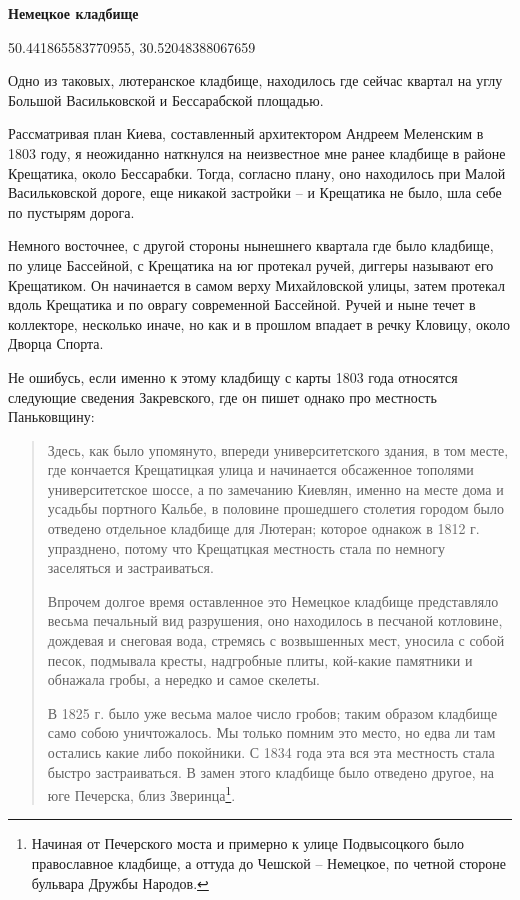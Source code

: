\textbf{Немецкое кладбище} 

50.441865583770955, 30.52048388067659

Одно из таковых, лютеранское кладбище, находилось где сейчас квартал на углу Большой Васильковской и Бессарабской площадью. 

Рассматривая план Киева, составленный архитектором Андреем Меленским в 1803 году,  я неожиданно наткнулся на неизвестное мне ранее кладбище в районе Крещатика, около Бессарабки. Тогда, согласно плану, оно находилось при Малой Васильковской дороге, еще никакой застройки – и Крещатика не было, шла себе по пустырям дорога.

Немного восточнее, с другой стороны нынешнего квартала где было кладбище, по улице Бассейной, с Крещатика на юг протекал ручей, диггеры называют его Крещатиком. Он начинается в самом верху Михайловской улицы, затем протекал вдоль Крещатика и по оврагу современной Бассейной. Ручей и ныне течет в коллекторе, несколько иначе, но как и в прошлом впадает в речку Кловицу, около Дворца Спорта.
  
Не ошибусь, если именно к этому кладбищу с карты 1803 года относятся следующие сведения Закревского, где он пишет однако про местность Паньковщину:

\begin{quotation}
Здесь, как было упомянуто, впереди университетского здания, в том месте, где кончается Крещатицкая улица и начинается обсаженное тополями университетское шоссе, а по замечанию Киевлян, именно на месте дома и усадьбы портного Кальбе, в половине прошедшего столетия городом было отведено отдельное кладбище для Лютеран; которое однакож в 1812 г. упразднено, потому что Крещатцкая местность стала по немногу заселяться и застраиваться. 

Впрочем долгое время оставленное это Немецкое кладбище представляло весьма печальный вид разрушения, оно находилось в песчаной котловине, дождевая и снеговая вода, стр\-емясь с возвышенных мест, уносила с собой песок, подмывала кресты, надгробные плиты, кой-какие памятники и обнажала гробы, а нередко и самое скелеты.

В 1825 г. было уже весьма малое число гробов; таким образом кладбище само собою уничтожалось. Мы только помним это место, но едва ли там остались какие либо покойники. С 1834 года эта вся эта местность стала быстро застраиваться. В замен этого кладбище было отведено другое, на юге Печерска, близ Зверинца\footnote{Начиная от Печерского моста и примерно к улице Подвысоцкого было православное кладбище, а оттуда до Чешской – Немецкое, по четной стороне бульвара Дружбы Народов.}.
\end{quotation}

